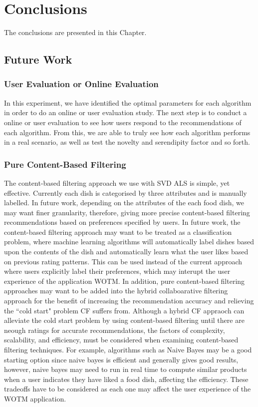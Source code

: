 \chapter{Conclusions}\label{C:con}
The conclusions are presented in this Chapter.


\section{Future Work}

\subsection{User Evaluation or Online Evaluation}
In this experiment, we have identified the optimal parameters for each algorithm in order to do an online or user evaluation study. The next step is to conduct a online or user evaluation to see how users respond to the recommendations of each algorithm. From this, we are able to truly see how each algorithm performs in a real scenario, as well as test the novelty and serendipity factor and so forth. 

\subsection{Pure Content-Based Filtering}
The content-based filtering approach we use with SVD ALS is simple, yet effective. Currently each dish is categorised by three attributes and is manually labelled. In future work, depending on the attributes of the each food dish, we may want finer granularity, therefore, giving more precise content-based filtering recommendations based on preferences specified by users.  In future work, the content-based filtering approach may want to be treated as a classification problem, where machine learning algorithms will automatically label dishes based upon the contents of the dish and automatically learn what the user likes based on previous rating patterns. This can be used instead of the current approach where users explicitly label their preferences, which may interupt the user experience of the application WOTM. In addition, pure content-based filtering approaches may want to be added into the hybrid collaboarative filtering approach for the benefit of increasing the recommendation accuracy and relieving the ``cold start" problem CF suffers from. Although a hybrid CF appraoch can alleviate the cold start problem by using content-based filtering until there are neough ratings for accurate recommendations, the factors of complexity, scalability, and efficiency, must be considered when examining content-based filtering techniques. For example, algorithms such as Naive Bayes may be a good starting option since naive bayes is efficient and generally gives good results, however, naive bayes may need to run in real time to compute similar products when a user indicates they have liked a food dish, affecting the efficiency. These tradeoffs have to be considered as each one may affect the user experience of the WOTM application. 

